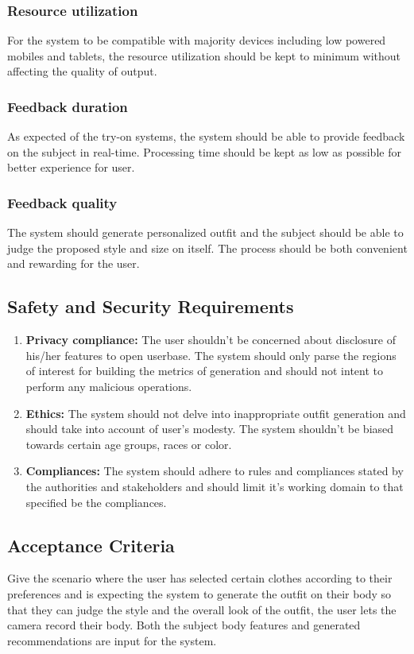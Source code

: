 		\subsubsection{Resource utilization}
			For the system to be compatible with majority devices including low powered mobiles and tablets, the resource utilization should be kept to minimum without affecting the quality of output.

		\subsubsection{Feedback duration}
			As expected of the try-on systems, the system should be able to provide feedback on the subject in real-time. Processing time should be kept as low as possible for better experience for user.

		\subsubsection{Feedback quality}
			The system should generate personalized outfit and the subject should be able to judge the proposed style and size on itself. The process should be both convenient and rewarding for the user.
		
	\subsection{Safety and Security Requirements}
		\begin{enumerate}
			\item \textbf{Privacy compliance:} The user shouldn't be concerned about disclosure of his/her features to open userbase. The system should only parse the regions of interest for building the metrics of generation and should not intent to perform any malicious operations.
			\item \textbf{Ethics:} The system should not delve into inappropriate outfit generation and should take into account of user's modesty. The system shouldn't be biased towards certain age groups, races or color.
			\item \textbf{Compliances:} The system should adhere to rules and compliances stated by the authorities and stakeholders and should limit it's working domain to that specified be the compliances.
		\end{enumerate}
	
	\subsection{Acceptance Criteria}
		Give the scenario where the user has selected certain clothes according to their preferences and is expecting the system to generate the outfit on their body so that they can judge the style and the overall look of the outfit, the user lets the camera record their body. Both the subject body features and generated recommendations are input for the system.

